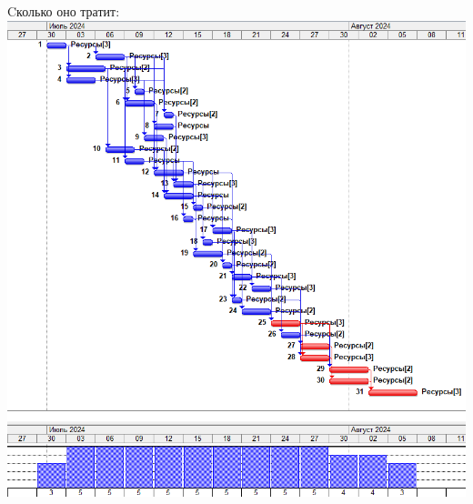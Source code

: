 \documentclass[14pt]{article}
\begin{document}
		{\LARGE Cколько оно тратит:}\\
		\includegraphics[width=\textwidth]{../img/1b1_answer.png}\\ 
\end{document}
